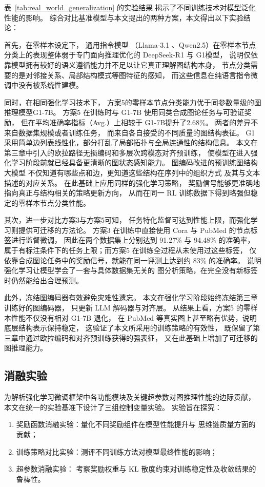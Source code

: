 表~\ref{tab:real_world_generalization} 的实验结果
揭示了不同训练技术对模型泛化性能的影响。
综合对比基准模型与本文提出的两种方案，本文得出以下实验结论：

首先，在零样本设定下，
通用指令模型
（Llama-3.1\cite{grattafiori2024llama3} 、Qwen2.5\cite{Yang2024Qwen25TR}）在零样本节点分类上的表现整体弱于专门面向推理优化的
DeepSeek-R1 与 G1模型，
说明仅依靠模型拥有较好的语义遵循能力并不足以让它真正理解图结构本身，
节点分类需要的是对邻接关系、局部结构模式等图特征的感知，
而这些信息在纯语言指令微调中没有被系统性建模。

同时，在相同强化学习技术下，
方案5的零样本节点分类能力优于同参数量级的图推理模型G1-7B。
方案5 在训练时与 G1-7B 使用同类合成图论任务与可验证奖励，
但在平均准确率指标（Avg.）上相较于 G1-7B提升了2.68\%。
两者的差异不来自数据集规模或者训练任务，
而来自各自接受的不同质量的图结构表征。
G1 采用简单边列表线性化，部分打乱了局部拓扑与全局连通性的结构信息。
本文在第三章中引入的欧拉路径无损编码和多层次跨模态对齐预训练，
使模型在进入强化学习阶段前就已经具备更清晰的图状态感知能力。
图编码改进的预训练图结构大模型
不仅知道有哪些点和边，更知道这些结构在序列中的组织方式
及其与文本描述的对应关系。
在此基础上应用同样的强化学习策略，
奖励信号能够更准确地指向真正与结构相关的策略更新方向，
从而在同一 RL 训练数据下得到略强但稳定的零样本节点分类性能。


其次，进一步对比方案3与方案5可知，
任务特化监督可达到性能上限，而强化学习则提供可迁移的方法论。
方案3 在训练中直接使用 Cora 与 PubMed 的节点标签进行监督微调，
因此在两个数据集上分别达到 91.27\% 与 94.48\% 的准确率，  
属于有标注条件下的任务上限；而方案5 在训练全过程从未使用过这些标签，
仅依靠合成图论任务中的奖励信号，就能在同一评测上达到约 83\% 的准确率。
说明强化学习让模型学会了一套与具体数据集无关的
图分析策略，在完全没有新标签时仍然能给出合理预测。

此外，冻结图编码器有效避免灾难性遗忘。
本文在强化学习阶段始终冻结第三章训练好的图编码器，
只更新 LLM 解码器与对齐层。
从结果上看，方案5 的零样本性能不仅没有相对 G1-7B 退化，
在 PubMed 等真实图上甚至略有优势，说明底层结构表示保持稳定，
这验证了本文所采用的训练策略的有效性，
既保留了第三章中通过欧拉编码和对齐预训练获得的强表征，
又在此基础上增加了可迁移的图推理能力。

\subsection{消融实验}
\label{sec:ablation}

为解析强化学习微调框架中各功能模块及关键超参数对图推理性能的边际贡献，
本文在统一的实验基准下设计了三组控制变量实验。
实验旨在探究：
\begin{enumerate}
\item 奖励函数消融实验：量化不同奖励组件在模型性能提升与
思维链质量方面的贡献；
\item 训练策略对比实验：测评不同训练方法对模型最终性能的影响；
\item 超参数消融实验：
考察奖励权重与 KL 散度约束对训练稳定性及收敛结果的鲁棒性。
\end{enumerate}

